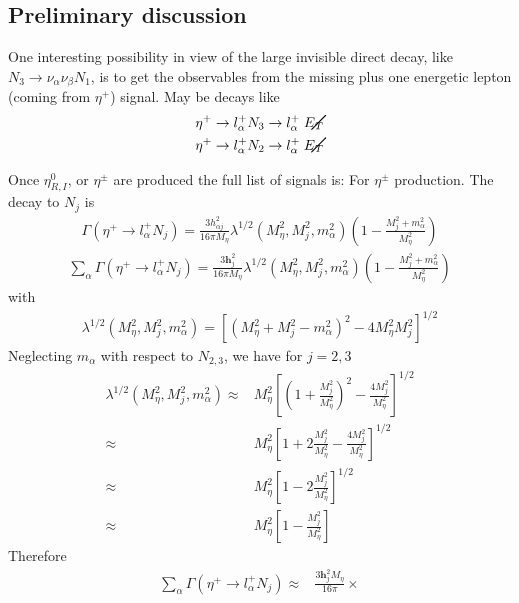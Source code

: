 \begin{subappendices}
\section{Preliminary discussion}
\label{sec:prel-disc}

One interesting possibility in view of the large invisible direct decay, like $N_3\to\nu_\alpha\nu_\beta N_1$, is to get the observables from the missing plus one energetic lepton (coming from $\eta^+$)  signal. May be decays like
\begin{align}
  \eta^+&\to l_\alpha^+ N_3 \to l_\alpha^+ \;\cancel{E}_T\nonumber\\
  \eta^+&\to l_\alpha^+ N_2 \to l_\alpha^+ \;\cancel{E}_T\nonumber\\
\end{align}

Once $\eta^0_{R,I}$, or $\eta^\pm$ are produced the full list of signals is: 
For $\eta^\pm$ production. The decay to $N_j$  is
\begin{align}
\Gamma(\eta^+\to l_\alpha^+ N_j)=\frac{3h_{\alpha j}^2}{16\pi M_\eta}\lambda^{1/2}\left(M_\eta^2,M_j^2,m_\alpha^2\right)\left(1-\frac{M_j^2+m_\alpha^2}{M_\eta^2}\right)
\end{align}
\begin{align}
  \sum_\alpha\Gamma(\eta^+\to l_\alpha^+ N_j)=\frac{3\mathbf{h}_j^2}{16\pi M_\eta}\lambda^{1/2}\left(M_\eta^2,M_j^2,m_\alpha^2\right)\left(1-\frac{M_j^2+m_\alpha^2}{M_\eta^2}\right)
\end{align}
with
\begin{align}
  \lambda^{1/2}\left(M_\eta^2,M_j^2,m_\alpha^2\right)=\left[\left(M_\eta^2+M_j^2-m_\alpha^2\right)^2-4M_\eta^2M_j^2\right]^{1/2}
\end{align}
Neglecting $m_\alpha$ with respect to $N_{2,3}$, we have for $j=2,3$
\begin{align}
  \lambda^{1/2}\left(M_\eta^2,M_j^2,m_\alpha^2\right)\approx&M_\eta^2\left[\left(1+\frac{M_j^2}{M_\eta^2}\right)^2-\frac{4M_j^2}{M_\eta^2}\right]^{1/2}\nonumber\\
  \approx&M_\eta^2\left[1+2\frac{M_j^2}{M_\eta^2}-\frac{4M_j^2}{M_\eta^2}\right]^{1/2}\nonumber\\
  \approx&M_\eta^2\left[1-2\frac{M_j^2}{M_\eta^2}\right]^{1/2}\nonumber\\
  \approx&M_\eta^2\left[1-\frac{M_j^2}{M_\eta^2}\right]
\end{align}
Therefore
\begin{align}
   \sum_\alpha\Gamma(\eta^+\to l_\alpha^+ N_j)\approx&\frac{3\mathbf{h}_j^2M_\eta}{16\pi}\times

\end{align}
\end{subappendices}
